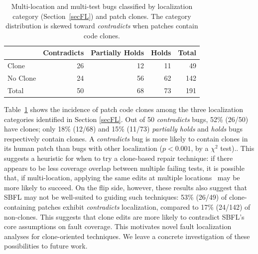 \documentclass[10pt, conference]{IEEEtran}
\begin{document}
\begin{table}
  {\begin{center}
      \begin{tabular} {lrrrr}
        \toprule
        & Contradicts & Partially Holds & Holds & Total \\
        \midrule
        Clone & 26 & 12 & 11 &  49 \\
        No Clone  & 24 & 56 & 62 & 142 \\
        \midrule
        Total     & 50 & 68 & 73 & 191 \\
        \bottomrule
      \end{tabular}
    \end{center}
  }

  \caption{\small Multi-location and multi-test bugs classified by localization
    category (Section~\ref{secFL}) and patch clones. The category distribution
    is skewed toward \emph{contradicts} when patches contain code clones.}
  \label{tab:cov_clones}
\end{table}

Table~\ref{tab:cov_clones} shows the incidence of patch code clones among the three 
localization categories identified in Section \ref{secFL}. 
Out of 50 \emph{contradicts} bugs, 52\% (26/50) have clones; only 
18\% (12/68) and 15\% (11/73)
\emph{partially holds} and \emph{holds} bugs respectively contain clones.
A \emph{contradicts} bug is more likely to contain clones in its
human patch than bugs with other localization  ($p < 0.001$, by a $\chi^2$ test).. 
This suggests a heuristic for when to try a clone-based repair technique: if there
appears to be less coverage overlap between multiple failing tests, it is
possible that, if multi-location, 
applying the same edits at multiple locations~\cite{saha2019harnessing} may be
more likely to succeed. On the flip
side, however, these results also suggest that SBFL may not be well-suited to
guiding such techniques: 
53\% (26/49) of clone-containing patches exhibit \emph{contradicts}
localization, compared to 17\% (24/142) of non-clones. This suggests that clone
edits  are more likely to contradict SBFL's core assumptions
on fault coverage.  This motivates novel fault localization analyses for
clone-oriented techniques.   We
leave a concrete investigation of these possibilities to future work.  

\end{document}
